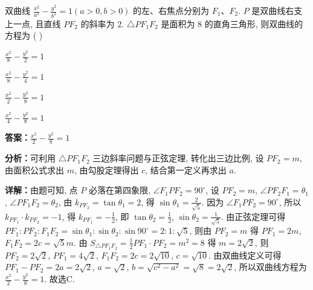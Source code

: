 \begin{question}[points=5]
双曲线 $\frac{x^2}{a^2}-\frac{y^2}{b^2}=1(a>0,b>0)$ 的左、右焦点分别为 $F_1$、$F_2$. $P$ 是双曲线右支上一点, 且直线 $PF_2$ 的斜率为 $2$. $\triangle PF_1F_2$ 是面积为 $8$ 的直角三角形, 则双曲线的方程为 ( )
\begin{choices}
  \item $\frac{x^2}{8}-\frac{y^2}{2}=1$
  \item $\frac{x^2}{8}-\frac{y^2}{4}=1$
  \item $\frac{x^2}{2}-\frac{y^2}{8}=1$
  \item $\frac{x^2}{4}-\frac{y^2}{8}=1$
\end{choices}
\begin{solution}
\textbf{答案：}$\frac{x^2}{2}-\frac{y^2}{8}=1$

\textbf{分析：}可利用 $\triangle PF_1F_2$ 三边斜率问题与正弦定理, 转化出三边比例, 设 $PF_2=m$, 由面积公式求出 $m$, 由勾股定理得出 $c$, 结合第一定义再求出 $a$.

\textbf{详解：}由题可知, 点 $P$ 必落在第四象限, $\angle F_1PF_2=90^\circ$, 设 $PF_2=m$, $\angle PF_2F_1=\theta_1$, $\angle PF_1F_2=\theta_2$, 由 $k_{PF_2}=\tan\theta_1=2$, 得 $\sin\theta_1=\frac{2}{\sqrt{5}}$. 因为 $\angle F_1PF_2=90^\circ$, 所以 $k_{PF_1}\cdot k_{PF_2}=-1$, 得 $k_{PF_1}=-\frac{1}{2}$, 即 $\tan\theta_2=\frac{1}{2}$, $\sin\theta_2=\frac{1}{\sqrt{5}}$. 由正弦定理可得 $PF_1:PF_2:F_1F_2=\sin\theta_1:\sin\theta_2:\sin90^\circ=2:1:\sqrt{5}$, 则由 $PF_2=m$ 得 $PF_1=2m$, $F_1F_2=2c=\sqrt{5}m$. 由 $S_{\triangle PF_1F_2}=\frac{1}{2}PF_1\cdot PF_2=m^2=8$ 得 $m=2\sqrt{2}$, 则 $PF_2=2\sqrt{2}$, $PF_1=4\sqrt{2}$, $F_1F_2=2c=2\sqrt{10}$, $c=\sqrt{10}$. 由双曲线定义可得 $PF_1-PF_2=2a=2\sqrt{2}$, $a=\sqrt{2}$, $b=\sqrt{c^2-a^2}=\sqrt{8}=2\sqrt{2}$, 所以双曲线方程为 $\frac{x^2}{2}-\frac{y^2}{8}=1$. 故选C.
\end{solution}
\end{question}

